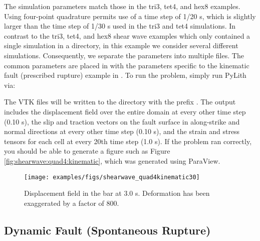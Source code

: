 The simulation parameters match those in the tri3, tet4, and hex8
examples. Using four-point quadrature permits use of a time step of
1/20 s, which is slightly larger than the time step of 1/30 s used in
the tri3 and tet4 simulations. In contrast to the tri3, tet4, and hex8
shear wave examples which only contained a single simulation in a
directory, in this example we consider several different simulations.
Consequently, we separate the parameters into multiple 
files. The common parameters are placed in 
with the parameters specific to the kinematic fault (prescribed
rupture) example in . To run the problem,
simply run PyLith via:
The VTK files will be written to the  directory with
the prefix . The output includes the
displacement field over the entire domain at every other time step
(0.10 s), the slip and traction vectors on the fault surface in
along-strike and normal directions at every other time step (0.10 s),
and the strain and stress tensors for each cell at every 20th time
step (1.0 s).  If the problem ran correctly, you should be able to
generate a figure such as Figure \vref{fig:shearwave:quad4:kinematic},
which was generated using ParaView.

\begin{figure}
  \texttt{[image: examples/figs/shearwave\_quad4kinematic30]}
  \caption{Displacement field in the bar at 3.0 s. Deformation has been exaggerated
    by a factor of 800.}
  \label{fig:shearwave:quad4:kinematic}
\end{figure}


\subsection{Dynamic Fault (Spontaneous Rupture)}


